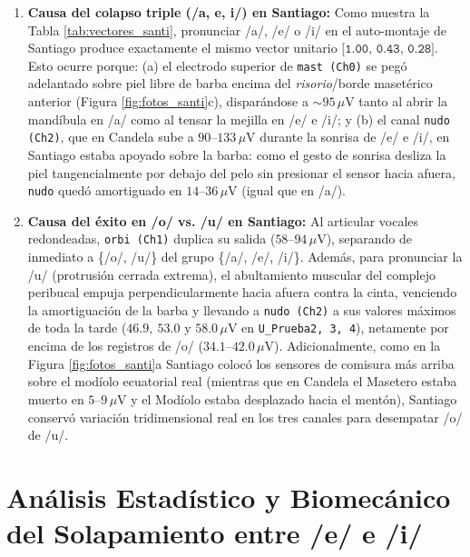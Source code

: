\documentclass[11pt,a4paper]{article}
\begin{document}
\begin{enumerate}
    \item \textbf{Causa del colapso triple (/a, e, i/) en Santiago:} Como muestra la Tabla \ref{tab:vectores_santi}, pronunciar /a/, /e/ o /i/ en el auto-montaje de Santiago produce exactamente el mismo vector unitario $\texttt{[1.00, 0.43, 0.28]}$. Esto ocurre porque: (a) el electrodo superior de \texttt{mast (Ch0)} se pegó adelantado sobre piel libre de barba encima del \textit{risorio}/borde masetérico anterior (Figura \ref{fig:fotos_santi}c), disparándose a $\sim 95\,\mu\text{V}$ tanto al abrir la mandíbula en /a/ como al tensar la mejilla en /e/ e /i/; y (b) el canal \texttt{nudo (Ch2)}, que en Candela sube a $90\text{--}133\,\mu\text{V}$ durante la sonrisa de /e/ e /i/, en Santiago estaba apoyado sobre la barba: como el gesto de sonrisa desliza la piel tangencialmente por debajo del pelo sin presionar el sensor hacia afuera, \texttt{nudo} quedó amortiguado en $14\text{--}36\,\mu\text{V}$ (igual que en /a/).
    \item \textbf{Causa del éxito en /o/ vs. /u/ en Santiago:} Al articular vocales redondeadas, \texttt{orbi (Ch1)} duplica su salida ($58\text{--}94\,\mu\text{V}$), separando de inmediato a \{/o/, /u/\} del grupo \{/a/, /e/, /i/\}. Además, para pronunciar la /u/ (protrusión cerrada extrema), el abultamiento muscular del complejo peribucal empuja perpendicularmente hacia afuera contra la cinta, venciendo la amortiguación de la barba y llevando a \texttt{nudo (Ch2)} a sus valores máximos de toda la tarde ($46.9,\ 53.0\text{ y }58.0\,\mu\text{V}$ en \texttt{U\_Prueba2, 3, 4}), netamente por encima de los registros de /o/ ($34.1\text{--}42.0\,\mu\text{V}$). Adicionalmente, como en la Figura \ref{fig:fotos_santi}a Santiago colocó los sensores de comisura más arriba sobre el modíolo ecuatorial real (mientras que en Candela el Masetero estaba muerto en $5\text{--}9\,\mu\text{V}$ y el Modíolo estaba desplazado hacia el mentón), Santiago conservó variación tridimensional real en los tres canales para desempatar /o/ de /u/.
\end{enumerate}

\section{Análisis Estadístico y Biomecánico del Solapamiento entre /e/ e /i/}
\end{document}
